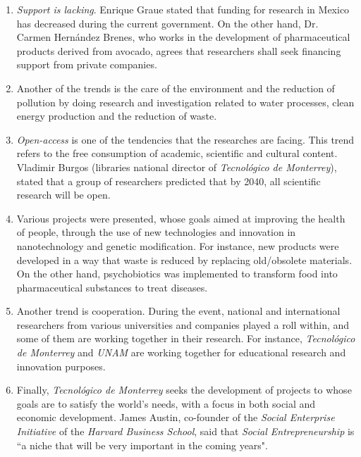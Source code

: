 \documentclass[11pt,a4paper]{article}
\begin{document}
\begin{enumerate}
	\item{
		\emph{Support is lacking}. Enrique Graue stated that funding for research in Mexico has decreased during the current government. On the other hand, Dr. Carmen Hernández Brenes, who works in the development of pharmaceutical products derived from avocado, agrees that researchers shall seek financing support from private companies.
	}
	\item{
		Another of the trends is the care of the environment and the reduction of pollution by doing research and investigation related to water processes, clean energy production and the reduction of waste.
	}
	\item{
		\emph{Open-access} is one of the tendencies that the researches are facing. This trend refers to the free consumption of academic, scientific and cultural content. Vladimir Burgos (libraries national director of \emph{Tecnológico de Monterrey}), stated that a group of researchers predicted that by 2040, all scientific research will be open.
	}
	\item{
		Various projects were presented, whose goals aimed at improving the health of people, through the use of new technologies and innovation in nanotechnology and genetic modification. For instance, new products were developed in a way that waste is reduced by replacing old/obsolete materials. On the other hand, psychobiotics was implemented to transform food into pharmaceutical substances to treat diseases.
	}
	\item{
		Another trend is cooperation. During the event, national and international researchers from various universities and companies played a roll within, and some of them are working together in their research. For instance, \emph{Tecnológico de Monterrey} and \emph{UNAM} are working together for educational research and innovation purposes.
	}
	\item{
		Finally, \emph{Tecnológico de Monterrey} seeks the development of projects to whose goals are to satisfy the world's needs, with a focus in both social and economic development. James Austin, co-founder of the \emph{Social Enterprise Initiative} of the \emph{Harvard Business School}, said that \emph{Social Entrepreneurship} is ``a niche that will be very important in the coming years".
	}
\end{enumerate}

\clearpage

\end{document}

